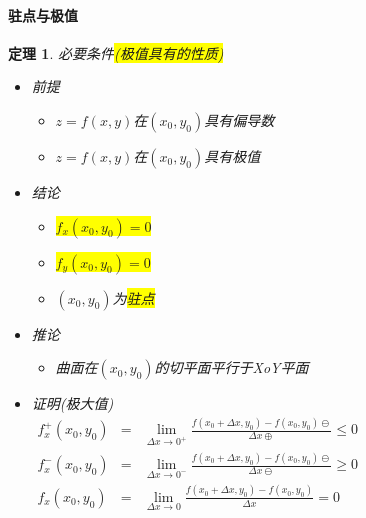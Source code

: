 \documentclass[UTF8,a4paper,12pt,scheme=chinese]{ctexbook}
\newcommand{\hl}[1]{\colorbox{yellow}{#1}}
\newtheorem{theorem}{定理}[section]
\theoremstyle{plain}
\begin{document}
	\paragraph{驻点与极值}
	\begin{theorem}
		必要条件\hl{(极值具有的性质)}
		\begin{itemize}
			\item 前提
			\begin{itemize}
				\item $ z=f(x,y) $在$ (x_0,y_0) $具有偏导数
				\item $ z=f(x,y) $在$ (x_0,y_0) $具有极值
			\end{itemize}
			\item 结论
			\begin{itemize}
				\item \hl{$ f_x(x_0,y_0)=0 $}
				\item \hl{$ f_y(x_0,y_0)=0 $}
				\item $ (x_0,y_0) $为\hl{驻点}
			\end{itemize}
			\item 推论
			\begin{itemize}
				\item 曲面在$ (x_0,y_0) $的切平面平行于XoY平面
			\end{itemize}
			\item 证明(极大值)\\
			$ 
			\begin{array}{rrr}
			f_x^+(x_0,y_0) & = & \lim\limits_{\Delta x\rightarrow0^+}\frac{f(x_0+\Delta x,y_0)-f(x_0,y_0)\ominus}{\Delta x\oplus} \leqslant 0\\ 
			f_x^-(x_0,y_0) & = & \lim\limits_{\Delta x\rightarrow0^-}\frac{f(x_0+\Delta x,y_0)-f(x_0,y_0)\ominus}{\Delta x\ominus} \geqslant 0\\ 
			f_x(x_0,y_0) & = & \lim\limits_{\Delta x\rightarrow0}\frac{f(x_0+\Delta x,y_0)-f(x_0,y_0)}{\Delta x} = 0\\ 
			\end{array} 
			 $
		\end{itemize}
	\end{theorem}
\end{document}
